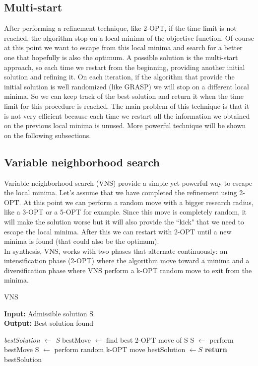\subsection{Multi-start}
After performing a refinement technique, like 2-OPT, if the time limit is not reached, the algorithm stop on a local minima of the objective function. Of course at this point we want to escape from this local minima and search for a better one that hopefully is also the optimum. A possible solution is the multi-start approach, so each time we restart from the beginning, providing another initial solution and refining it. On each iteration, if the algorithm that provide the initial solution is well randomized (like GRASP) we will stop on a different local minima. So we can keep track of the best solution and return it when the time limit for this procedure is reached.
The main problem of this technique is that it is not very efficient because each time we restart all the information we obtained on the previous local minima is unused.
More powerful technique will be shown on the following subsections.

\subsection{Variable neighborhood search}
Variable neighborhood search (VNS) provide a simple yet powerful way to escape the local minima. Let's assume that we have completed the refinement using 2-OPT. At this point we can perform a random move with a bigger research radius, like a 3-OPT or a 5-OPT for example. Since this move is completely random, it will make the solution worse but it will also provide the ``kick" that we need to escape the local minima. After this we can restart with 2-OPT until a new minima is found (that could also be the optimum).\\
In synthesis, VNS, works with two phases that alternate continuously: an intensification  phase (2-OPT) where the algorithm move toward a minima and a diversification phase where VNS perform a k-OPT random move to exit from the minima.

\begin{algorithm}
	\caption{VNS}\label{VNS method}
	\hspace*{\algorithmicindent} \textbf{Input:} Admissible solution S \\
	\hspace*{\algorithmicindent} \textbf{Output:} Best solution found
    \begin{algorithmic}[1]
    		\State \textit{bestSolution $\leftarrow$ S}
			\State bestMove $\leftarrow$ find best 2-OPT move of S
				\State S $\leftarrow$ perform bestMove
			\Else
				\State S $\leftarrow$ perform random k-OPT move
			\EndIf
				\State bestSolution $\leftarrow S$
			\EndIf
		\EndWhile
		\State \textbf{return} bestSolution
    \end{algorithmic}
\end{algorithm}


